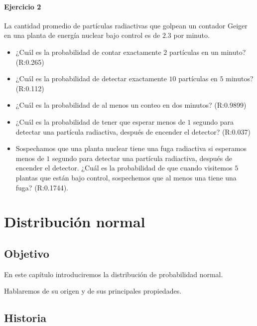 \documentclass[
]{book}
\begin{document}
\hypertarget{ejercicio-2-5}{%
\subsubsection{Ejercicio 2}\label{ejercicio-2-5}}

La cantidad promedio de partículas radiactivas que golpean un contador Geiger en una planta de energía nuclear bajo control es de \(2.3\) por minuto.

\begin{itemize}
\item
  ¿Cuál es la probabilidad de contar exactamente \(2\) partículas en un minuto? (R:0.265)
\item
  ¿Cuál es la probabilidad de detectar exactamente \(10\) partículas en \(5\) minutos? (R:0.112)
\item
  ¿Cuál es la probabilidad de al menos un conteo en dos minutos? (R:0.9899)
\item
  ¿Cuál es la probabilidad de tener que esperar menos de \(1\) segundo para detectar una partícula radiactiva, después de encender el detector? (R:0.037)
\item
  Sospechamos que una planta nuclear tiene una fuga radiactiva si esperamos menos de \(1\) segundo para detectar una partícula radiactiva, después de encender el detector. ¿Cuál es la probabilidad de que cuando visitemos \(5\) plantas que están bajo control, sospechemos que al menos una tiene una fuga? (R:0.1744).
\end{itemize}

\hypertarget{distribuciuxf3n-normal}{%
\chapter{Distribución normal}\label{distribuciuxf3n-normal}}

\hypertarget{objetivo-5}{%
\section{Objetivo}\label{objetivo-5}}

En este capítulo introduciremos la distribución de probabilidad normal.

Hablaremos de su origen y de sus principales propiedades.

\hypertarget{historia}{%
\section{Historia}\label{historia}}
\end{document}
